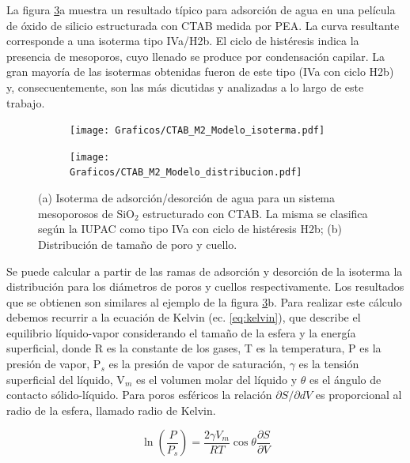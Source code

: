 		La figura \ref{fig:pea_ej}a muestra un resultado típico para adsorción de agua en una película de óxido de silicio estructurada con CTAB medida por PEA. La curva resultante corresponde a una isoterma tipo IVa/H2b. El ciclo de histéresis indica la presencia de mesoporos, cuyo llenado se produce por condensación capilar. \cite{Gregg1967}La gran mayoría de las isotermas obtenidas fueron de este tipo (IVa con ciclo H2b) y, consecuentemente, son las más dicutidas y analizadas a lo largo de este trabajo. 

			\begin{figure}[!ht]
		     	  		\begin{subfigure}[t]{0.491\textwidth}
		     	  		\texttt{[image: Graficos/CTAB\_M2\_Modelo\_isoterma.pdf]}
						\label{fig:pea_ej1}
						\end{subfigure}
						\begin{subfigure}[t]{0.495\textwidth}
		     	  		\texttt{[image: Graficos/CTAB\_M2\_Modelo\_distribucion.pdf]}
						\label{fig:pea_ej2}
						\end{subfigure}
						\vspace*{-0.6cm}
						\caption[Isoterma de adsorción/desorción tipo IVa, H2b.]{(a) Isoterma de adsorción/desorción de agua para un sistema mesoporosos de SiO$_2$ estructurado con CTAB. La misma se clasifica según la IUPAC como tipo IVa con ciclo de histéresis H2b; (b) Distribución de tamaño de poro y cuello.}
						\label{fig:pea_ej}
						\end{figure}			
		\vspace{0.3cm}				
		Se puede calcular a partir de las ramas de adsorción y desorción de la isoterma la distribución para los diámetros de poros y cuellos respectivamente. Los resultados que se obtienen son similares al ejemplo de la figura \ref{fig:pea_ej}b. Para realizar este cálculo debemos recurrir a la ecuación de Kelvin (ec. \ref{eq:kelvin}), que describe el equilibrio líquido-vapor considerando el tamaño de la esfera y la energía superficial, donde R es la constante de los gases, T es la temperatura, P es la presión de vapor, P$_s$ es la presión de vapor de saturación, $\gamma$ es la tensión superficial del líquido, V$_m$ es el volumen molar del líquido y $\theta$ es el ángulo de contacto sólido-líquido. \cite{Baklanov2000,Boissiere2005,Sing1985} Para poros esféricos la relación $\partial S/ \partial dV$ es proporcional al radio de la esfera, llamado radio de Kelvin.\cite{FernandezPrini2005}
		
			\begin{equation}
			  	 \ln \left(\frac{P}{P_s}\right)=\frac{2\gamma V_m}{RT} \cos{\theta}\frac{\partial S}{\partial V}
			     \label{eq:kelvin}
			 	 \end{equation}					
	
